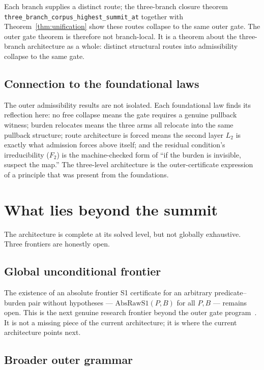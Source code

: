 \documentclass[11pt]{article}
\theoremstyle{plain}
\theoremstyle{definition}
\theoremstyle{remark}
\newcommand{\AbsRawSone}{\mathrm{AbsRawS1}}
\newcommand{\Stwo}{L_2}
\newcommand{\lean}[1]{\texttt{\small #1}}
\begin{document}
Each branch supplies a distinct route; the three-branch closure theorem\newline
\lean{three\_branch\_corpus\_highest\_summit\_at} together with
Theorem~\ref{thm:unification} show these routes collapse to the same outer gate.
The outer gate theorem is therefore not branch-local.  It is a theorem about
the three-branch architecture as a whole: distinct structural routes into
admissibility collapse to the same gate.

\subsection{Connection to the foundational laws}

The outer admissibility results are not isolated.  Each foundational law
finds its reflection here: no free collapse means the gate requires a
genuine pullback witness; burden relocates means the three arms all
relocate into the same pullback structure; route architecture is forced
means the second layer $\Stwo$ is exactly what admission forces above
itself; and the residual condition's irreducibility ($F_2$) is the
machine-checked form of ``if the burden is invisible, suspect the map.''
The three-level architecture is the outer-certificate expression of a
principle that was present from the foundations.

\section{What lies beyond the summit}
\label{sec:beyond}

The architecture is complete at its solved level, but not globally
exhaustive.  Three frontiers are honestly open.

\subsection{Global unconditional frontier}

The existence of an absolute frontier S1 certificate for an arbitrary
predicate--burden pair without hypotheses --- $\AbsRawSone(P,B)$ for all
$P,B$ --- remains open.  This is the next genuine research frontier
beyond the outer gate program~\cite{SpivackAdequacy}.  It is not a missing
piece of the current architecture; it is where the current architecture
points next.

\subsection{Broader outer grammar}
\end{document}

